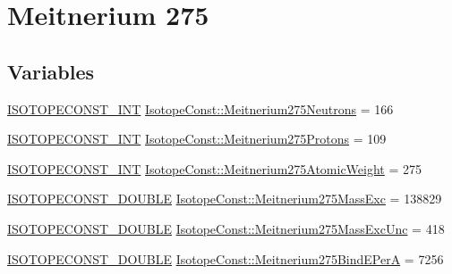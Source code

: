 \hypertarget{group___isotope_const-_meitnerium-_mt275}{}\section{Meitnerium 275}
\label{group___isotope_const-_meitnerium-_mt275}
\subsection*{Variables}
\begin{DoxyCompactItemize}
\item 
\mbox{\hyperlink{group___isotope_const-_macros_ga5f18360b3e99483a35c32d789e62621c}{I\+S\+O\+T\+O\+P\+E\+C\+O\+N\+S\+T\+\_\+\+I\+NT}} \mbox{\hyperlink{group___isotope_const-_meitnerium-_mt275_gae33fc22c6b18f8da5ea204ae23878c8c}{Isotope\+Const\+::\+Meitnerium275\+Neutrons}} = 166
\item 
\mbox{\hyperlink{group___isotope_const-_macros_ga5f18360b3e99483a35c32d789e62621c}{I\+S\+O\+T\+O\+P\+E\+C\+O\+N\+S\+T\+\_\+\+I\+NT}} \mbox{\hyperlink{group___isotope_const-_meitnerium-_mt275_gab3334c054a2e5173d17176dd603e8c62}{Isotope\+Const\+::\+Meitnerium275\+Protons}} = 109
\item 
\mbox{\hyperlink{group___isotope_const-_macros_ga5f18360b3e99483a35c32d789e62621c}{I\+S\+O\+T\+O\+P\+E\+C\+O\+N\+S\+T\+\_\+\+I\+NT}} \mbox{\hyperlink{group___isotope_const-_meitnerium-_mt275_ga0135eb5663df8bccbcc31d328793789c}{Isotope\+Const\+::\+Meitnerium275\+Atomic\+Weight}} = 275
\item 
\mbox{\hyperlink{group___isotope_const-_macros_ga8f45a7272ce02c0b4c65c44636ed719a}{I\+S\+O\+T\+O\+P\+E\+C\+O\+N\+S\+T\+\_\+\+D\+O\+U\+B\+LE}} \mbox{\hyperlink{group___isotope_const-_meitnerium-_mt275_ga1232ce468596c86d8707b8801c8061ea}{Isotope\+Const\+::\+Meitnerium275\+Mass\+Exc}} = 138829
\item 
\mbox{\hyperlink{group___isotope_const-_macros_ga8f45a7272ce02c0b4c65c44636ed719a}{I\+S\+O\+T\+O\+P\+E\+C\+O\+N\+S\+T\+\_\+\+D\+O\+U\+B\+LE}} \mbox{\hyperlink{group___isotope_const-_meitnerium-_mt275_gaff6019384f382f42287326df6038b2cb}{Isotope\+Const\+::\+Meitnerium275\+Mass\+Exc\+Unc}} = 418
\item 
\mbox{\hyperlink{group___isotope_const-_macros_ga8f45a7272ce02c0b4c65c44636ed719a}{I\+S\+O\+T\+O\+P\+E\+C\+O\+N\+S\+T\+\_\+\+D\+O\+U\+B\+LE}} \mbox{\hyperlink{group___isotope_const-_meitnerium-_mt275_ga1d520038597448f94bcfd04cfc62a062}{Isotope\+Const\+::\+Meitnerium275\+Bind\+E\+PerA}} = 7256
\item 

\end{DoxyCompactItemize}
